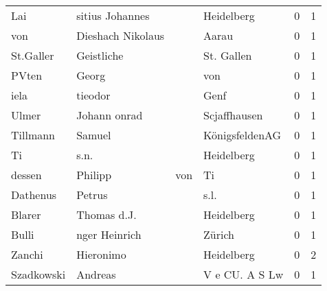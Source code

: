 \begin{center}
\begin{tiny}
\begin{longtabu}{llllrr}
                      Lai &                    sitius Johannes &             &                                  Heidelberg &          0 &         1 \\
                      von &                  Dieshach Nikolaus &             &                                       Aarau &          0 &         1 \\
                St.Galler &                         Geistliche &             &                                  St. Gallen &          0 &         1 \\
                    PVten &                              Georg &             &                                         von &          0 &         1 \\
                     iela &                            tieodor &             &                                        Genf &          0 &         1 \\
                    Ulmer &                       Johann onrad &             &                                Scjaffhausen &          0 &         1 \\
                 Tillmann &                             Samuel &             &                              KönigsfeldenAG &          0 &         1 \\
                       Ti &                               s.n. &             &                                  Heidelberg &          0 &         1 \\
                   dessen &                            Philipp &         von &                                          Ti &          0 &         1 \\
                 Dathenus &                             Petrus &             &                                        s.l. &          0 &         1 \\
                   Blarer &                        Thomas d.J. &             &                                  Heidelberg &          0 &         1 \\
                    Bulli &                      nger Heinrich &             &                                      Zürich &          0 &         1 \\
                   Zanchi &                          Hieronimo &             &                                  Heidelberg &          0 &         2 \\
               Szadkowski &                            Andreas &             &                              V e CU. A S Lw &          0 &         1 \\

\end{longtabu}
\end{tiny}
\end{center}
